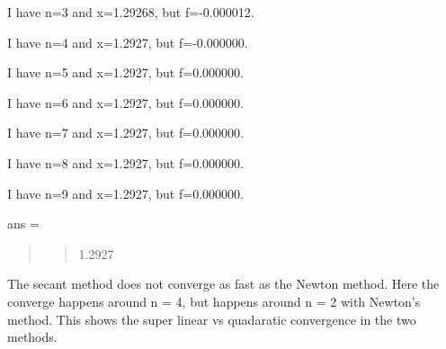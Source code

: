 \documentclass[]{article}
\begin{document}
I have n=3 and x=1.29268, but f=-0.000012.

I have n=4 and x=1.2927, but f=-0.000000.

I have n=5 and x=1.2927, but f=0.000000.

I have n=6 and x=1.2927, but f=0.000000.

I have n=7 and x=1.2927, but f=0.000000.

I have n=8 and x=1.2927, but f=0.000000.

I have n=9 and x=1.2927, but f=0.000000.

ans =

\begin{quote}
\begin{quote}
1.2927
\end{quote}
\end{quote}

The secant method does not converge as fast as the Newton method. Here
the converge happens around n = 4, but happens around n = 2 with
Newton's method. This shows the super linear vs quadaratic convergence
in the two methods.
\end{document}
